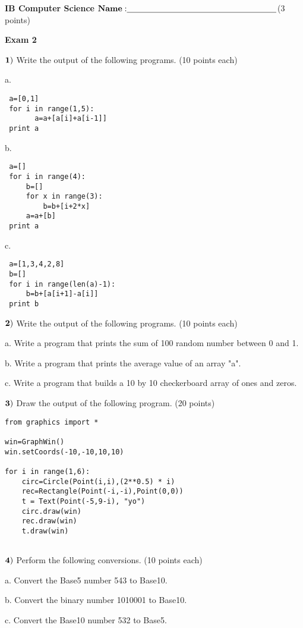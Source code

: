 \documentclass{article}
\begin{document}

\doublespacing
\textbf{IB Computer Science }                        %
 \hfill                             %
$ {\bf Name: } \underline{\hspace{2.5in}}$(3 points)

\begin{centering}
\vspace{1cm}
\textbf{Exam 2}\\
\end{centering}
\vspace{1cm}
 

  
 $\bf{1)}$ Write the output of the following programs. (10 points each)
 
 \vspace{1cm}

  
 a.   \begin{verbatim}
 a=[0,1]
 for i in range(1,5):
       a=a+[a[i]+a[i-1]]
 print a
 \end{verbatim}
 \vspace{1cm}
 
 b.  \begin{verbatim}
 a=[]
 for i in range(4):
     b=[]
     for x in range(3):
         b=b+[i+2*x]
     a=a+[b]
 print a
 \end{verbatim}
 \vspace{1cm}
 
 c.  \begin{verbatim}
 a=[1,3,4,2,8]
 b=[]
 for i in range(len(a)-1):
     b=b+[a[i+1]-a[i]]
 print b
 \end{verbatim}
 
  \newpage
  
  $\bf{2)}$ Write the output of the following programs. (10 points each)
  
  a.  Write a program that prints the sum of 100 random number between 0 and 1. 
  
  b.  Write a program that prints the average value of an array "a". 
  
  c.  Write a program that builds a 10 by 10 checkerboard array of ones and zeros.

  
  
  
    \newpage
  
  $\bf{3)}$  Draw the output of the following program. (20 points)
  \begin{verbatim}
from graphics import *

win=GraphWin()
win.setCoords(-10,-10,10,10)

for i in range(1,6):
    circ=Circle(Point(i,i),(2**0.5) * i)
    rec=Rectangle(Point(-i,-i),Point(0,0))
    t = Text(Point(-5,9-i), "yo")
    circ.draw(win)
    rec.draw(win)
    t.draw(win)
    
    \end{verbatim}
    
   
  \newpage
  
  $\bf{4)}$ Perform the following conversions. (10 points each)
  \vspace{0.5cm}
  
   a. Convert the Base5 number 543 to Base10. 
  
  b. Convert the binary number 1010001 to Base10. 
  
  c. Convert the Base10 number 532 to Base5.
  
  

 
\end{document}
